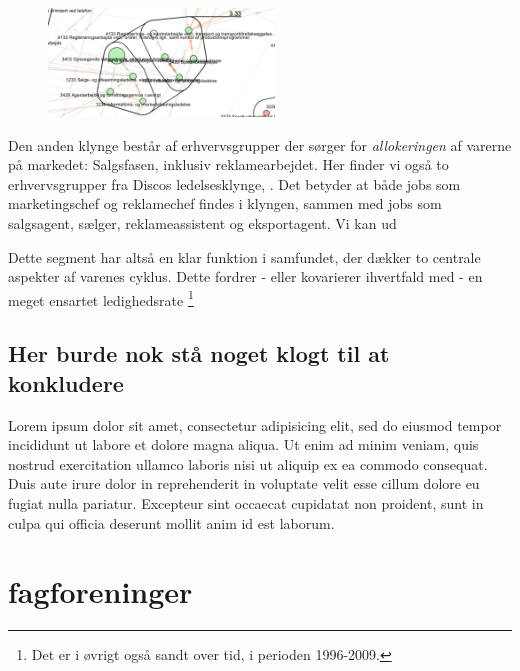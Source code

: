 % 
\begin{figure}
  \vspace{-20pt}
  \begin{center}
    \includegraphics[width=6cm]{fig/segzoom/seg_3_33_ledighed.pdf}
   \caption{}
   \label{fig delanalyse2 zoom seg3.33 ledighed}
  \end{center}
  \vspace{-20pt}
\end{figure}
%

Den anden klynge består af erhvervsgrupper der sørger for \emph{allokeringen} af varerne på markedet: Salgsfasen, inklusiv reklamearbejdet. Her finder vi også to erhvervsgrupper fra Discos ledelsesklynge, . Det betyder at både jobs som marketingschef og reklamechef findes i klyngen, sammen med jobs som salgsagent, sælger, reklameassistent og eksportagent. Vi kan ud 

Dette segment har altså en klar funktion i samfundet, der dækker to centrale aspekter af varenes cyklus. Dette fordrer - eller kovarierer ihvertfald med -  en meget ensartet ledighedsrate%
%
\footnote{ Det er i øvrigt også sandt over tid, i perioden 1996-2009.}%
%


%
\subsection{Her burde nok stå noget klogt til at konkludere }
%

Lorem ipsum dolor sit amet, consectetur adipisicing elit, sed do eiusmod
tempor incididunt ut labore et dolore magna aliqua. Ut enim ad minim veniam,
quis nostrud exercitation ullamco laboris nisi ut aliquip ex ea commodo
consequat. Duis aute irure dolor in reprehenderit in voluptate velit esse
cillum dolore eu fugiat nulla pariatur. Excepteur sint occaecat cupidatat non
proident, sunt in culpa qui officia deserunt mollit anim id est laborum.



\section{fagforeninger \label{sec_delanalyse2 fagforeninger}}

